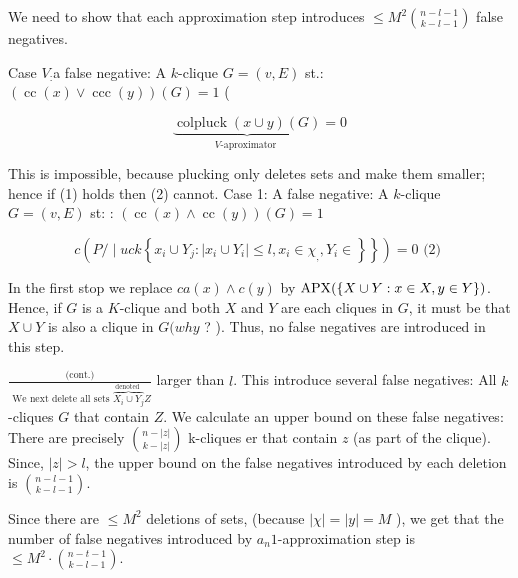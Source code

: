 We need to show that each approximation step introduces $\leq M^2\binom{n-l-1}{k-l-1}$ false negatives.


Case $V_{:}$a false negative:
A $k$-clique $G=(v, E)$ st.: $(\operatorname{cc}(x) \vee \operatorname{ccc}(y))(G)=1$ (

$$
\underbrace{\operatorname{colpluck}(x \cup y)(G)}_{V \text {-aproximator }}=0
$$


This is impossible, because plucking only deletes sets and make them smaller; hence if (1) holds then (2) cannot.
Case 1:
A false negative:
A $k$-clique $G=(v, E)$ st: : $(\operatorname{cc}(x) \wedge \operatorname{cc}(y))(G)=1$

$$
\left.c\left(P / \mid u c k\left\{x_i \cup Y_j:\left|x_i \cup Y_i\right| \leq l, x_i \in \chi_{,}, Y_i \in\right\}\right\}\right)=0 \text { (2) }
$$


In the first stop we replace $c a(x) \wedge c(y)$ by $\mathrm{APX}(\{X \cup Y: x \in X, y \in Y\})$.
Hence, if $G$ is a $K$-clique and both $X$ and $Y$ are each cliques in $G$, it must be that $X \cup Y$ is also a clique in $G(w h y$ ? ). Thus, no false negatives are introduced in this step.


$\frac{\text { (cont.) }}{\text { We next delete all sets } \overbrace{X_i \cup Y_j}^{\text {denoted }} Z}$ larger than $l$. This introduce several false negatives:
All $k$-cliques $G$ that contain $Z$.
We calculate an upper bound on these false negatives: There are precisely $\binom{n-|z|}{k-|z|}$ k-cliques er that contain $z$ (as part of the clique). Since, $|z|>l$, the upper bound on the false negatives introduced by each deletion is $\binom{n-l-1}{k-l-1}$.

Since there are $\leq M^2$ deletions of sets, (because $|\chi|=|y|=M$ ), we get that the number of false negatives introduced by $a_n 1$-approximation step is $\leq M^2 \cdot\binom{n-t-1}{k-l-1}$.



